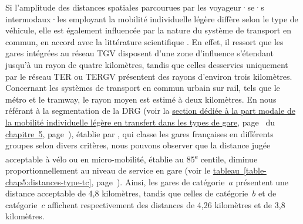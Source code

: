 \begin{refsegment}
Si l'amplitude des distances spatiales parcourues par les voyageur·se·s intermodaux·les employant la mobilité individuelle légère diffère selon le type de véhicule, elle est également influencée par la nature du système de transport en commun, en accord avec la littérature scientifique \textcolor{blue}{\autocite[105]{flamm_public_2014}}. En effet, il ressort que les gares intégrées au réseau \acrshort{TGV} disposent d'une zone d'influence s'étendant jusqu'à un rayon de quatre kilomètres, tandis que celles desservies uniquement par le réseau \acrshort{TER} ou \acrshort{TERGV} présentent des rayons d'environ trois kilomètres. Concernant les systèmes de transport en commun urbain sur rail, tels que le métro et le tramway, le rayon moyen est estimé à deux kilomètres. En nous référant à la segmentation de la \acrfull{DRG} (voir la \hyperref[chap4:part-modale-gares-centre-periurbain]{section dédiée à la part modale de la mobilité individuelle légère en transfert dans les types de gare}, page~\pageref{chap4:part-modale-gares-centre-periurbain} du \hyperref[chap5:titre]{chapitre~5}, page~\pageref{chap5:titre}), établie par \textcolor{blue}{\textcite{sncf_gares__connexions_gares_2024}}, qui classe les gares françaises en différents groupes selon divers critères, nous pouvons observer que la distance jugée acceptable à vélo ou en micro-mobilité, établie au 85\textsuperscript{e} centile, diminue proportionnellement au niveau de service en gare (voir le \hyperref[table-chap5:distances-type-tc]{tableau~\ref{table-chap5:distances-type-tc}}, page~\pageref{table-chap5:distances-type-tc}). Ainsi, les gares de catégorie~\(a\) présentent une distance acceptable de 4,8 kilomètres, tandis que celles de catégorie~\(b\) et de catégorie~\(c\) affichent respectivement des distances de 4,26 kilomètres et de 3,8 kilomètres.%



\end{refsegment}

